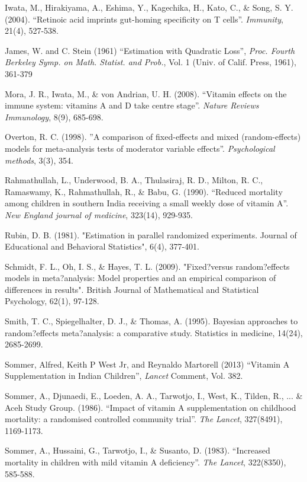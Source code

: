 \documentclass[12pt]{article}
\begin{document}
\begin{thebibliography}{99}
 Iwata, M., Hirakiyama, A., Eshima, Y., Kagechika, H., Kato, C., \& Song, S. Y. (2004). ``Retinoic acid imprints gut-homing specificity on T cells''. \emph{Immunity}, 21(4), 527-538.

 James, W. and C. Stein (1961) ``Estimation with Quadratic Loss'', \emph{Proc. Fourth Berkeley Symp. on Math. Statist. and Prob.}, Vol. 1 (Univ. of Calif. Press, 1961), 361-379

 Mora, J. R., Iwata, M., \& von Andrian, U. H. (2008). ``Vitamin effects on the immune system: vitamins A and D take centre stage''. \emph{Nature Reviews Immunology}, 8(9), 685-698.

 Overton, R. C. (1998). ''A comparison of fixed-effects and mixed (random-effects) models for meta-analysis tests of moderator variable effects''. \emph{Psychological methods}, 3(3), 354.

 Rahmathullah, L., Underwood, B. A., Thulasiraj, R. D., Milton, R. C., Ramaswamy, K., Rahmathullah, R., \& Babu, G. (1990). ``Reduced mortality among children in southern India receiving a small weekly dose of vitamin A''. \emph{New England journal of medicine}, 323(14), 929-935.

 Rubin, D. B. (1981). "Estimation in parallel randomized experiments. Journal of Educational and Behavioral Statistics", 6(4), 377-401.

 Schmidt, F. L., Oh, I. S., \& Hayes, T. L. (2009). "Fixed?versus random?effects models in meta?analysis: Model properties and an empirical comparison of differences in results". British Journal of Mathematical and Statistical Psychology, 62(1), 97-128.

 Smith, T. C., Spiegelhalter, D. J., \& Thomas, A. (1995). Bayesian approaches to random?effects meta?analysis: a comparative study. Statistics in medicine, 14(24), 2685-2699.

 Sommer, Alfred, Keith P West Jr, and Reynaldo Martorell (2013) ``Vitamin A Supplementation in Indian Children'', \emph{Lancet} Comment, Vol. 382.

 Sommer, A., Djunaedi, E., Loeden, A. A., Tarwotjo, I., West, K., Tilden, R., ... \& Aceh Study Group. (1986). ``Impact of vitamin A supplementation on childhood mortality: a randomised controlled community trial''. \emph{The Lancet}, 327(8491), 1169-1173.

 Sommer, A., Hussaini, G., Tarwotjo, I., \& Susanto, D. (1983). ``Increased mortality in children with mild vitamin A deficiency''. \emph{The Lancet}, 322(8350), 585-588.


\end{thebibliography}
\end{document}
